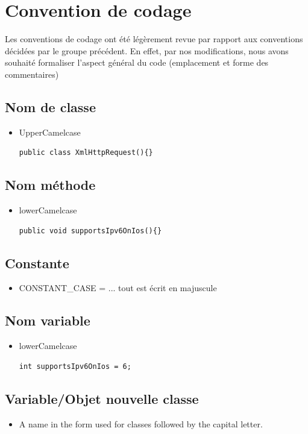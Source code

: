 \documentclass[10pt,a4paper]{article}
\begin{document}
\newpage
\section{Convention de codage}
Les conventions de codage ont été légèrement revue par rapport aux conventions décidées par le groupe précédent. En effet, par nos modifications, nous avons souhaité formaliser l'aspect général du code (emplacement et forme des commentaires) 
\subsection{Nom de classe}
\begin{itemize}
\item UpperCamelcase
\begin{lstlisting}
public class XmlHttpRequest(){}
\end{lstlisting}
\end{itemize}

\subsection{Nom méthode}
\begin{itemize}
\item lowerCamelcase
\begin{lstlisting}
public void supportsIpv6OnIos(){}
\end{lstlisting}
\end{itemize}  

\subsection{Constante}
\begin{itemize}
\item CONSTANT\_CASE = ... tout est écrit en majuscule
\end{itemize}  

\subsection{Nom variable}
\begin{itemize}
\item lowerCamelcase
\begin{lstlisting}
int supportsIpv6OnIos = 6;
\end{lstlisting}
\end{itemize}  

\subsection{Variable/Objet nouvelle classe}
\begin{itemize}
\item A name in the form used for classes followed by the capital letter.  
\end{itemize}
\end{document}
